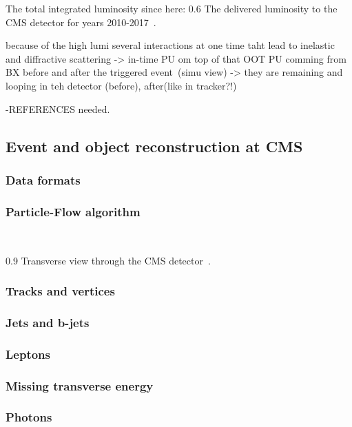 The total integrated luminosity since here:
                 {0.6}       %
                 { The delivered luminosity to the CMS detector for years 2010-2017~\cite{website:CMSlumi}. }


because of the high lumi several interactions at one time taht lead to inelastic and diffractive scattering -> 
in-time PU
om top of that OOT PU comming from BX before and after the triggered event~\cite{Bayatian:2006nff}(simu view) -> they are remaining and looping in teh detector (before), after(like in tracker?!)

-REFERENCES needed.

\newpage

\subsection{Event and object reconstruction at CMS}


\subsubsection{Data formats}
\subsubsection{Particle-Flow algorithm}
~\cite{Sirunyan:2017ulk}

                 {0.9}       %
                 { Transverse view through the CMS detector~\cite{Sirunyan:2017ulk}. }

\subsubsection{Tracks and vertices}
\subsubsection{Jets and b-jets}
\subsubsection{Leptons}
\subsubsection{Missing transverse energy}
\subsubsection{Photons}

